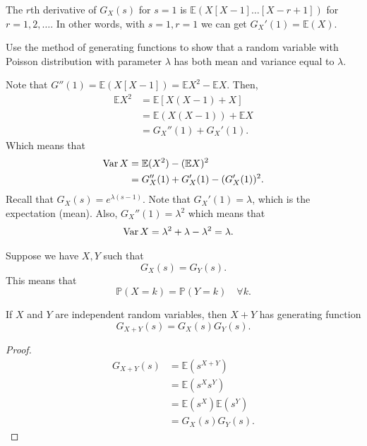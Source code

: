 \begin{theorem}
	The \( r \)th derivative of \( G_X(s) \) for \( s=1 \) is \( \mathbb{E}(X[X-1]\ldots [X-r+1]) \) for \( r = 1,2,\ldots  \). In other words, with \( s=1, r=1 \) we can get \( G_X'(1) = \mathbb{E}(X) \).
\end{theorem}

\begin{eg}
	Use the method of generating functions to show that a random variable with Poisson distribution with parameter \( \lambda  \) has both mean and variance equal to \( \lambda  \).
\end{eg}
\begin{explanation}
	Note that \( G''(1) = \mathbb{E}(X[X-1]) = \mathbb{E}X^{2} - \mathbb{E}X \). Then,
	\begin{align*}
		\mathbb{E}X^{2}  &= \mathbb{E}[X(X-1) + X] \\
		&= \mathbb{E}(X(X-1)) + \mathbb{E}X \\
		&= G_X''(1) + G_X'(1)
	.\end{align*}
	Which means that 
	\begin{align*}
		\operatorname{Var} X &= \mathbb{E}(X^{2} ) - (\mathbb{E}X)^{2}  \\
		&= G_X''(1) + G_X'(1) - (G_X'(1))^{2} 
	.\end{align*}
	Recall that \( G_X(s) = e^{\lambda (s-1)}  \). Note that \( G_X'(1) = \lambda  \), which is the expectation (mean). Also, \( G_X''(1) = \lambda ^{2}  \) which means that 
	\begin{align*}
		\operatorname{Var} X &= \lambda ^{2} + \lambda - \lambda ^{2} = \lambda 
	.\end{align*}
\end{explanation}

\begin{theorem}
	Suppose we have \( X, Y \) such that \[
		G_X(s) = G_Y(s) 
	.\] This means that \[
		\mathbb{P}(X = k) = \mathbb{P}(Y =k ) \quad \forall k
	.\] 
\end{theorem}

\begin{theorem}
	If \( X \) and \( Y \) are independent random variables, then \( X+Y \) has generating function \[
		G_{X+Y}(s) = G_X(s) G_Y(s)
	.\] 
\end{theorem}
\begin{proof}
	\begin{align*}
		G_{X+Y}(s) &= \mathbb{E}(s^{X+Y} ) \\
		&= \mathbb{E}(s^{X}s^{Y}  ) \\
		&= \mathbb{E}(s^{X} )\mathbb{E}(s^{Y} ) \tag{Independence}\\
		&= G_X(s)G_Y(s) 
	.\end{align*}
\end{proof}

